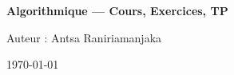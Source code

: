 \begin{titlepage}
\centering
{\Huge\bfseries Algorithmique — Cours, Exercices, TP\par}
\vspace{2cm}
{\Large Auteur : Antsa Raniriamanjaka\par}
\vfill
{\large \today}
\end{titlepage}
\clearpage
